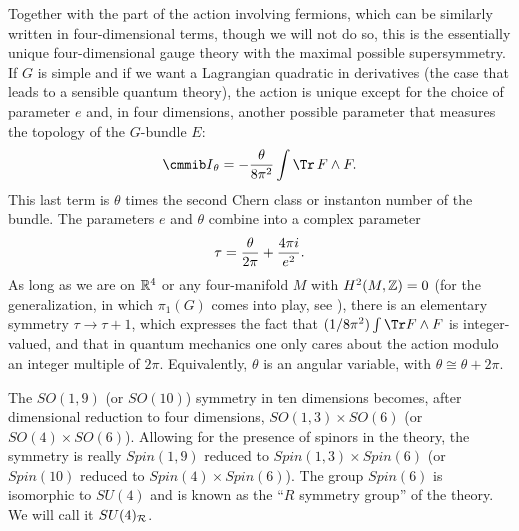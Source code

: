 Together with the part of the action involving fermions, which can
be similarly written in four-dimensional terms, though we will not
do so, this is the essentially unique four-dimensional gauge
theory with the maximal possible supersymmetry.  If $G$ is simple
and if we want a Lagrangian quadratic in derivatives (the case
that leads to a sensible quantum theory), the action is unique
except for the choice of parameter $e$ and, in four dimensions,
another possible parameter that measures the topology of the
$G$-bundle $E$: %
\setcounter{equation}{10}
\begin{equation}\label{eq:oopy}
{{\cmmib I}}_{\theta}=-{\theta\over
8\pi^2}\int \Tr \,F\wedge F.
\end{equation}
 This last term is $\theta$ times the
second Chern class or instanton number of the bundle.  The
parameters $e$ and $\theta$ combine into a complex parameter
\setcounter{equation}{11}
\begin{equation}\label{eq:ingo}
\tau={\theta\over 2\pi}+{4\pi i\over e^2}.
\end{equation}
 As long as
we are on $\Bbb{R}^4$ or any four-manifold $M$ with
$H^2(M,\Bbb{Z})=0$ (for the generalization, in which $\pi_1(G)$
comes into play, see \cite{ref45,ref26}), there is an
elementary symmetry $\tau\to\tau+1$, which expresses the fact that
$(1/8\pi^2)\int\Tr F\wedge F$ is integer-valued, and that in
quantum mechanics one only cares about the action modulo an
integer multiple of $2\pi$. Equivalently, $\theta$ is an angular
variable, with $\theta\cong\theta+2\pi$.

The $SO(1,9)$ (or $SO(10)$) symmetry in ten dimensions becomes,
after dimensional reduction to four dimensions, $SO(1,3)\times
SO(6)$ (or $SO(4)\times SO(6)$). Allowing for the presence of
spinors in the theory, the symmetry is really $Spin(1,9)$ reduced
to $Spin(1,3)\times Spin(6)$ (or $Spin(10)$ reduced to
$Spin(4)\times Spin(6)$).  The group $Spin(6)$ is isomorphic to
$SU(4)$ and is known as the ``$R$ symmetry group'' of the theory.
We will call it $SU(4)_{{\cal R}}$.

